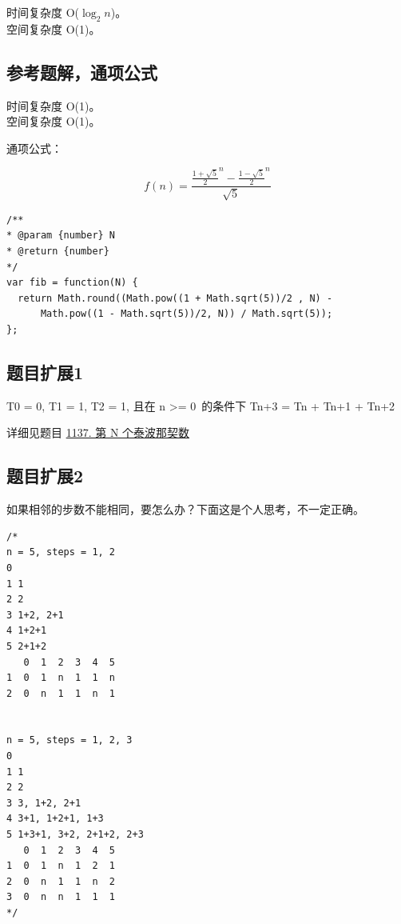 时间复杂度 O(${\log}_2 n$)。\\
空间复杂度 O(1)。

\subsection{参考题解，通项公式}

时间复杂度 O(1)。\\
空间复杂度 O(1)。

通项公式：

\begin{displaymath}
  f(n) = \frac
  {{ \frac{1 + \sqrt{5}}{2} }^{n} - { \frac{1 - \sqrt{5}}{2} }^{n}}
  {\sqrt{5}}
\end{displaymath}

\begin{verbatim}
/**
* @param {number} N
* @return {number}
*/
var fib = function(N) {
  return Math.round((Math.pow((1 + Math.sqrt(5))/2 , N) -
      Math.pow((1 - Math.sqrt(5))/2, N)) / Math.sqrt(5));
};
\end{verbatim}

\subsection{题目扩展1}

T0 = 0, T1 = 1, T2 = 1, 且在 n >= 0 的条件下 Tn+3 = Tn + Tn+1 + Tn+2

详细见题目 \hyperref[leetcode:1137]{1137. 第 N 个泰波那契数}

\subsection{题目扩展2}

如果相邻的步数不能相同，要怎么办？下面这是个人思考，不一定正确。

\begin{verbatim}
/*
n = 5, steps = 1, 2
0
1 1
2 2
3 1+2, 2+1
4 1+2+1
5 2+1+2
   0  1  2  3  4  5
1  0  1  n  1  1  n
2  0  n  1  1  n  1


n = 5, steps = 1, 2, 3
0
1 1
2 2
3 3, 1+2, 2+1
4 3+1, 1+2+1, 1+3
5 1+3+1, 3+2, 2+1+2, 2+3
   0  1  2  3  4  5
1  0  1  n  1  2  1
2  0  n  1  1  n  2
3  0  n  n  1  1  1
*/
\end{verbatim}

